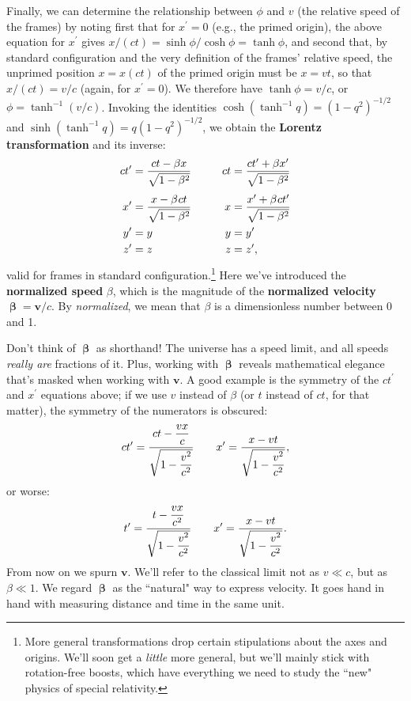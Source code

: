\documentclass[12pt]{article}
\renewcommand{\vv}[1]{\mathbf{#1}}
\newcommand{\vvbeta}{\bm{\upbeta}}
\begin{document}
Finally, we can determine the relationship between $\phi$ and $v$ (the relative speed of the frames) by noting first that for $x^{\prime} = 0$ (e.g., the primed origin), the above equation for $x^{\prime}$ gives $x / (ct) = \sinh \phi / \cosh \phi = \tanh \phi$, and second that, by standard configuration and the very definition of the frames' relative speed, the unprimed position $x = x(ct)$ of the primed origin must be ${x = vt}$, so that $x / (ct) = v / c$ (again, for $x^{\prime} = 0$). We therefore have $\tanh \phi = v / c$, or $\phi = \tanh^{-1}{(v / c)}$. Invoking the identities ${\cosh (\tanh^{-1}{q}) = (1 - q^2)^{-1/2}}$ and ${\sinh (\tanh^{-1}{q}) = q(1 - q^2)^{-1/2}}$, we obtain the \textbf{Lorentz transformation} and its inverse:
\begin{equation}\label{eq:lt}
\begin{aligned}
ct^{\prime} &= \dfrac{ct - \beta x}{\sqrt{1- \beta ^2}}& ct &= \dfrac{ct^\prime + \beta x^\prime}{\sqrt{1- \beta ^2}} \\[3pt]
x^{\prime} &= \dfrac{x - \beta \mkern1mu c t}{\sqrt{1- \beta ^2}}& \qquad x &= \dfrac{x^\prime + \beta \mkern1mu c t^\prime}{\sqrt{1- \beta ^2}}\\
y^{\prime} &= y& y&= y^\prime \\
z^{\prime} &= z& z&= z^\prime,
\end{aligned}
\end{equation}
valid for frames in standard configuration.\footnote{More general transformations drop certain stipulations about the axes and origins. We'll soon get a \emph{little} more general, but we'll mainly stick with rotation-free boosts, which have everything we need to study the ``new" physics of special relativity.} Here we've introduced the \textbf{normalized speed} $\beta$, which is the magnitude of the \textbf{normalized velocity} $\vvbeta=\vv v/c$. By \emph{normalized}, we mean that $\beta$ is a dimensionless number between 0 and 1.

Don't think of $\vvbeta$ as shorthand! The universe has a speed limit, and all speeds \emph{really are} fractions of it. Plus, working with $\vvbeta$ reveals mathematical elegance that's masked when working with $\vv v$. A good example is the symmetry of the $ct^\prime$ and $x^\prime$ equations above; if we use $v$ instead of $\beta$ (or $t$ instead of $ct$, for that matter), the symmetry of the numerators is obscured:
\begin{equation*}
ct^\prime = \frac{ct - \dfrac{vx}{\vphantom{V_v} c}}{\sqrt{1 - \dfrac{v^2}{c^2}}} \qquad x^\prime = \frac{x - vt}{\sqrt{1 - \dfrac{v^2}{c^2}}},
\end{equation*}
or worse:
\begin{equation*}
t^\prime = \frac{t - \dfrac{vx}{\vphantom{V_v} c^2}}{\sqrt{1 - \dfrac{v^2}{c^2}}} \qquad x^\prime = \frac{x - vt}{\sqrt{1 - \dfrac{v^2}{c^2}}}.
\end{equation*}
From now on we spurn $\vv v$. We'll refer to the classical limit not as $v \ll c$, but as $\beta \ll 1$. We regard $\vvbeta$ as the ``natural" way to express velocity. It goes hand in hand with measuring distance and time in the same unit.
 
\end{document}
